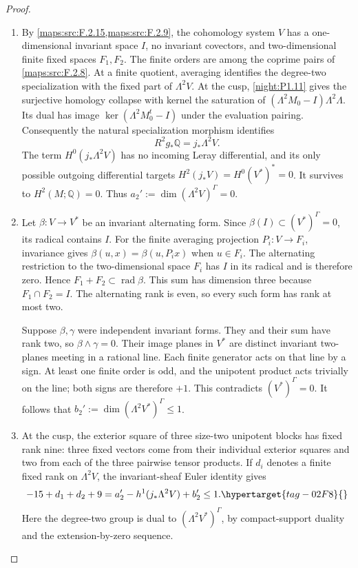 \documentclass[11pt,a4paper]{article}
\numberwithin{equation}{section}
\theoremstyle{definition}
\begin{document}
\begin{proof}
\begin{enumerate}[label=\arabic*.]
\item By \cref{maps:src:F.2.15,maps:src:F.2.9}, the cohomology
system $V$ has a one-dimensional invariant space $I$, no invariant
covectors, and two-dimensional finite fixed spaces $F_1,F_2$.
The finite orders are among the coprime pairs of
\cref{maps:src:F.2.8}.  At a finite quotient, averaging identifies
the degree-two specialization with the fixed part of $\Lambda^2V$.
At the cusp, \cref{night:P1.11} gives the surjective homology
collapse with kernel the saturation of
$(\Lambda^2M_0-I)\Lambda^2\Lambda$.  Its dual has image
$\ker(\Lambda^2M_0^t-I)$ under the evaluation pairing.  Consequently
the natural specialization morphism identifies
\[
 R^2g_*\mathbb Q=j_*\Lambda^2V.
\]
The term $H^0(j_*\Lambda^2V)$ has no incoming Leray differential,
and its only possible outgoing differential targets
$H^2(j_*V)=H^0(V^*)^*=0$.  It survives to $H^2(M;\mathbb Q)=0$.
Thus $a_2':=\dim(\Lambda^2V)^\Gamma=0$.

\item Let $\beta:V\to V^*$ be an invariant alternating form.
Since $\beta(I)\subset(V^*)^\Gamma=0$, its radical contains $I$.
For the finite averaging projection $P_i:V\to F_i$, invariance gives
$\beta(u,x)=\beta(u,P_ix)$ when $u\in F_i$.
The alternating restriction to the two-dimensional space $F_i$
has $I$ in its radical and is therefore zero.  Hence
$F_1+F_2\subset\operatorname{rad}\beta$.  This sum has dimension
three because $F_1\cap F_2=I$.  The alternating rank is even,
so every such form has rank at most two.

Suppose $\beta,\gamma$ were independent invariant forms.
They and their sum have rank two, so
$\beta\wedge\gamma=0$.  Their image planes in $V^*$
are distinct invariant two-planes meeting in a rational line.
Each finite generator acts on that line by a sign.  At least one
finite order is odd, and the unipotent product acts trivially on the
line; both signs are therefore $+1$.  This contradicts
$(V^*)^\Gamma=0$.  It follows that
$b_2':=\dim(\Lambda^2V^*)^\Gamma\leq1$.

\item At the cusp, the exterior square of three size-two unipotent
blocks has fixed rank nine: three fixed vectors come from their
individual exterior squares and two from each of the three pairwise
tensor products.  If $d_i$ denotes a finite fixed rank on
$\Lambda^2V$, the invariant-sheaf Euler identity gives
\begin{equation}
 -15+d_1+d_2+9
 =a_2'-h^1(j_*\Lambda^2V)+b_2'\leq1.
 \hypertarget{tag-02F8}{}\label{maps:eq:F.40}
\end{equation}
Here the degree-two group is dual to
$(\Lambda^2V^*)^\Gamma$, by compact-support duality and the
extension-by-zero sequence.


\end{enumerate}
\end{proof}
\end{document}
